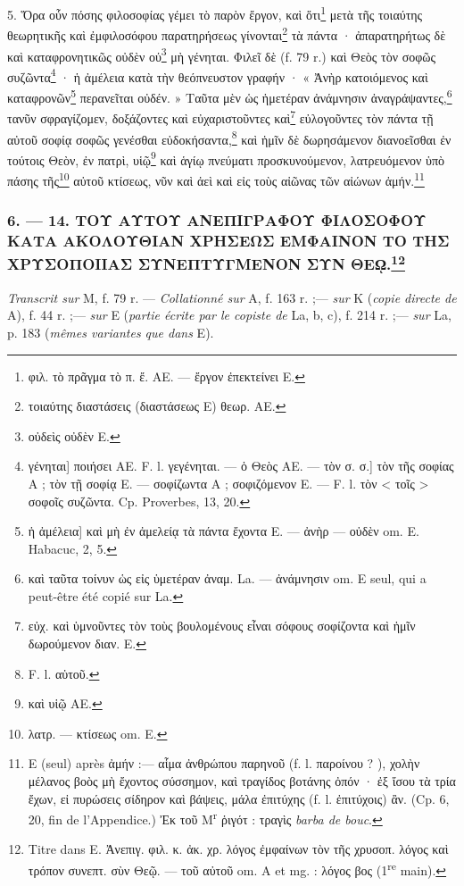 \documentclass[a4paper, 11pt, oneside, polutonikogreek, french]{article}
\begin{document}
5. Ὅρα οὖν πόσης φιλοσοφίας γέμει τὸ παρὸν ἔργον, καὶ ὅτι\footnote{φιλ. τὸ πρᾶγμα τὸ π. ἔ. AE. --- ἔργον ἐπεκτείνει E.} μετὰ τῆς τοιαύτης θεωρητικῆς καὶ ἐμφιλοσόφου παρατηρήσεως γίνονται\footnote{τοιαύτης διαστάσεις (διαστάσεως E) θεωρ. AE.} τὰ πάντα · ἀπαρατηρήτως δὲ καὶ καταφρονητικῶς οὐδὲν οὐ\footnote{οὐδεὶς οὐδὲν E.} μὴ γένηται. Φιλεῖ δὲ (f. 79 r.) καὶ Θεὸς τὸν σοφῶς συζῶντα\footnote{γένηται] ποιήσει AE. F. l. γεγένηται. --- ὁ Θεὸς AE. --- τὸν σ. σ.] τὸν τῆς σοφίας A ; τὸν τῇ σοφίᾳ E. --- σοφίζωντα A ; σοφιζόμενον E. --- F. l. τὸν < τοῖς > σοφοῖς συζῶντα. Cp. Proverbes, 13, 20.} · ἡ ἀμέλεια κατὰ τὴν θεόπνευστον γραφήν · « Ἀνὴρ κατοιόμενος καὶ καταφρονῶν\footnote{ἡ ἀμέλεια] καὶ μὴ ἐν ἀμελείᾳ τὰ πάντα ἔχοντα E. --- ἀνὴρ --- οὐδὲν om. E. Habacuc, 2, 5.} περανεῖται οὐδέν. » Ταῦτα μὲν ὡς ἡμετέραν ἀνάμνησιν ἀναγράψαντες,\footnote{καὶ ταῦτα τοίνυν ὡς εἰς ὑμετέραν ἀναμ. La. --- ἀνάμνησιν om. E seul, qui a peut-être été copié sur La.} τανῦν σφραγίζομεν, δοξάζοντες καὶ εὐχαριστοῦντες καὶ\footnote{εὐχ. καὶ ὑμνοῦντες τὸν τοὺς βουλομένους εἶναι σόφους σοφίζοντα καὶ ἡμῖν δωρούμενον διαν. E.} εὐλογοῦντες τὸν πάντα τῇ αὐτοῦ σοφίᾳ σοφῶς γενέσθαι εὐδοκήσαντα,\footnote{F. l. αὑτοῦ.} καὶ ἡμῖν δὲ δωρησάμενον διανοεῖσθαι ἐν τούτοις Θεὸν, ἐν πατρὶ, υἱῷ\footnote{καὶ υἱῷ AE.} καὶ ἁγίῳ πνεύματι προσκυνούμενον, λατρευόμενον ὑπὸ πάσης τῆς\footnote{λατρ. --- κτίσεως om. E.} αὐτοῦ κτίσεως, νῦν καὶ ἀεὶ καὶ εἰς τοὺς αἰῶνας τῶν αἰώνων ἀμήν.\footnote{E (seul) après ἀμήν :--- αἷμα ἀνθρώπου παρηνοῦ (f. l. παροίνου ? ), χολὴν μέλανος βοὸς μὴ ἔχοντος σύσσημον, καὶ τραγίδος βοτάνης ὀπόν · ἐξ ἴσου τὰ τρία ἔχων, εἰ πυρώσεις σίδηρον καὶ βάψεις, μάλα ἐπιτύχης (f. l. ἐπιτύχοις) ἂν. (Cp. 6, 20, fin de l'Appendice.) Ἐκ τοῦ M\textsuperscript{r} ῥιγότ : τραγὶς \emph{barba de bouc}.}

\bigskip
\centerline{\EightStarTaper}
\centerline{\EightStarTaper\EightStarTaper}
\bigskip

\subsubsection[6. --- 14. ΤΟΥ ΑΥΤΟΥ ΑΝΕΠΙΓΡΑΦΟΥ ΦΙΛΟΣΟΦΟΥ ΚΑΤΑ ΑΚΟΛΟΥΘΙΑΝ ΧΡΗΣΕΩΣ ΕΜΦΑΙΝΟΝ ΤΟ ΤΗΣ ΧΡΥΣΟΠΟΙΙΑΣ ΣΥΝΕΠΤΥΓΜΕΝΟΝ ΣΥΝ ΘΕῼ.]{6. --- 14. ΤΟΥ ΑΥΤΟΥ ΑΝΕΠΙΓΡΑΦΟΥ ΦΙΛΟΣΟΦΟΥ ΚΑΤΑ ΑΚΟΛΟΥΘΙΑΝ ΧΡΗΣΕΩΣ ΕΜΦΑΙΝΟΝ ΤΟ ΤΗΣ ΧΡΥΣΟΠΟΙΙΑΣ ΣΥΝΕΠΤΥΓΜΕΝΟΝ ΣΥΝ ΘΕῼ.\footnote{Titre dans E. Ἀνεπιγ. φιλ. κ. ἀκ. χρ. λόγος ἐμφαίνων τὸν τῆς χρυσοπ. λόγος καὶ τρόπον συνεπτ. σὺν Θεῷ. --- τοῦ αὐτοῦ om. A et mg. : λόγος βος (1\textsuperscript{re} main).}}

\emph{Transcrit sur} M, f. 79 r. --- \emph{Collationné sur} A, f. 163 r. ;--- \emph{sur} K (\emph{copie directe de} A), f. 44 r. ;--- \emph{sur} E (\emph{partie écrite par le copiste de} La, b, c), f. 214 r. ;--- \emph{sur} La, p. 183 (\emph{mêmes variantes que dans} E).
\end{document}
